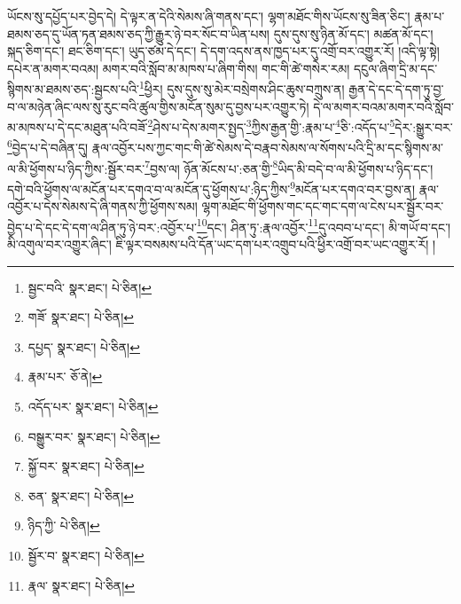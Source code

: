 ཡོངས་སུ་དཔྱོད་པར་བྱེད་དེ། དེ་ལྟར་ན་དེའི་སེམས་ཞི་གནས་དང་། ལྷག་མཐོང་གིས་ཡོངས་སུ་ཟིན་ཅིང་། རྣམ་པ་ཐམས་ཅད་དུ་ཡོན་ཏན་ཐམས་ཅད་ཀྱི་རྒྱུར་ཉེ་བར་སོང་བ་ཡིན་པས། དུས་དུས་སུ་ཉིན་མོ་དང་། མཚན་མོ་དང་། སྐད་ཅིག་དང་། ཐང་ཅིག་དང་། ཡུད་ཙམ་དེ་དང་། དེ་དག་འདས་ནས་ཁྱད་པར་དུ་འགྲོ་བར་འགྱུར་རོ། །འདི་ལྟ་སྟེ། དཔེར་ན་མགར་བའམ། མགར་བའི་སློབ་མ་མཁས་པ་ཞིག་གིས། གང་གི་ཚེ་གསེར་རམ། དངུལ་ཞིག་དྲི་མ་དང་སྙིགས་མ་ཐམས་ཅད་:སྦྱངས་པའི་\footnote{སྦྱང་བའི་  སྣར་ཐང་།  པེ་ཅིན། }ཕྱིར། དུས་དུས་སུ་མེར་བསྲེགས་ཤིང་ཆུས་བཀྲུས་ན། རྒྱན་དེ་དང་དེ་དག་ཏུ་བྱ་བ་ལ་མཉེན་ཞིང་ལས་སུ་རུང་བའི་ཚུལ་གྱིས་མངོན་སུམ་དུ་བྱས་པར་འགྱུར་ཏེ། དེ་ལ་མགར་བའམ་མགར་བའི་སློབ་མ་མཁས་པ་དེ་དང་མཐུན་པའི་བཟོ་\footnote{གཟོ་  སྣར་ཐང་།  པེ་ཅིན། }ཤེས་པ་དེས་མགར་སྤྱད་\footnote{དཔྱད་  སྣར་ཐང་།  པེ་ཅིན། }ཀྱིས་རྒྱན་གྱི་:རྣམ་པ་\footnote{རྣམ་པར་  ཅོ་ནེ། }ཅི་:འདོད་པ་\footnote{འདོད་པར་  སྣར་ཐང་།  པེ་ཅིན། }དེར་:སྒྱུར་བར་\footnote{བསྒྱུར་བར་  སྣར་ཐང་།  པེ་ཅིན། }བྱེད་པ་དེ་བཞིན་དུ། རྣལ་འབྱོར་པས་ཀྱང་གང་གི་ཚེ་སེམས་དེ་བརྣབ་སེམས་ལ་སོགས་པའི་དྲི་མ་དང་སྙིགས་མ་ལ་མི་ཕྱོགས་པ་ཉིད་ཀྱིས་:སྦྱོར་བར་\footnote{སྐྱོ་བར་  སྣར་ཐང་།  པེ་ཅིན། }བྱས་ལ། ཉོན་མོངས་པ་:ཅན་གྱི་\footnote{ཅན་  སྣར་ཐང་།  པེ་ཅིན། }ཡིད་མི་བདེ་བ་ལ་མི་ཕྱོགས་པ་ཉིད་དང་། དགེ་བའི་ཕྱོགས་ལ་མངོན་པར་དགའ་བ་ལ་མངོན་དུ་ཕྱོགས་པ་:ཉིད་ཀྱིས་\footnote{ཉིད་ཀྱི་  པེ་ཅིན། }མངོན་པར་དགའ་བར་བྱས་ན། རྣལ་འབྱོར་པ་དེས་སེམས་དེ་ཞི་གནས་ཀྱི་ཕྱོགས་སམ། ལྷག་མཐོང་གི་ཕྱོགས་གང་དང་གང་དག་ལ་ངེས་པར་སྦྱོར་བར་བྱེད་པ་དེ་དང་དེ་དག་ལ་ཤིན་ཏུ་ཉེ་བར་:འབྱོར་པ་\footnote{སྦྱོར་བ་  སྣར་ཐང་།  པེ་ཅིན། }དང་། ཤིན་ཏུ་:རྣལ་འབྱོར་\footnote{རྣལ་  སྣར་ཐང་།  པེ་ཅིན། }དུ་འབབ་པ་དང་། མི་གཡོ་བ་དང་། མི་འགུལ་བར་འགྱུར་ཞིང་། ཇི་ལྟར་བསམས་པའི་དོན་ཡང་དག་པར་འགྲུབ་པའི་ཕྱིར་འགྲོ་བར་ཡང་འགྱུར་རོ། །
